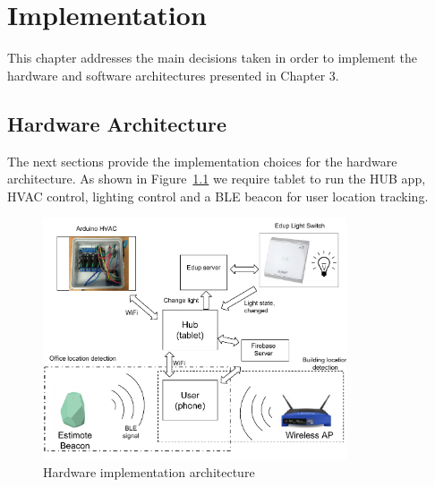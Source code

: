 \chapter{Implementation}
\label{chapter:implementation}

This chapter addresses the main decisions taken in order to implement the hardware and software architectures presented in Chapter 3.


\section{Hardware Architecture}


The next sections provide the implementation choices for the hardware architecture. As shown in Figure~\ref{architecture_system} we require tablet to run the HUB app, HVAC control, lighting control and a \ac{BLE} beacon for user location tracking.



\begin{figure}[h]
\centering
\includegraphics[width=0.8\textwidth]{Figures/harware_arch_imp}
\caption{Hardware implementation architecture}
\label{architecture_system}
\end{figure}






